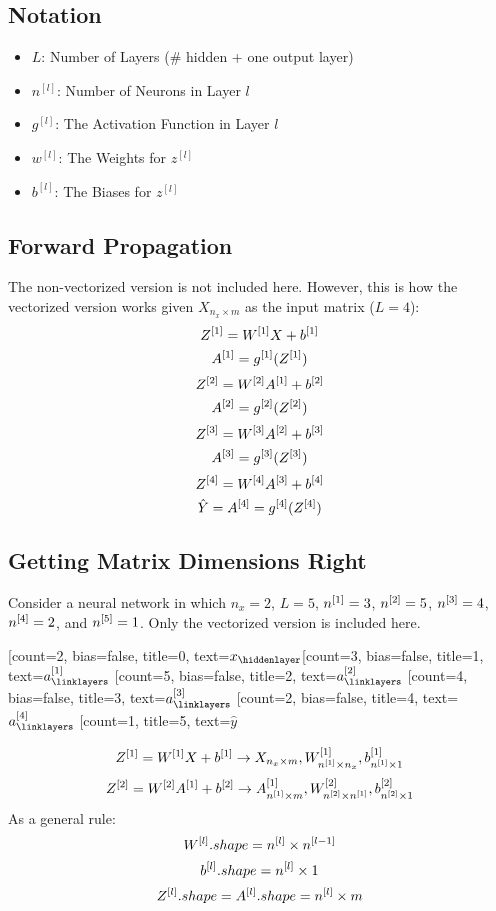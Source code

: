 \subsection{Notation}
\begin{itemize}
	\item $L$: Number of Layers (\# hidden + one output layer)
	\item $n^{[l]}$: Number of Neurons in Layer $l$
	\item $g^{[l]}$: The Activation Function in Layer $l$
	\item $w^{[l]}$: The Weights for $z^{[l]}$
	\item $b^{[l]}$: The Biases for $z^{[l]}$
\end{itemize}
\subsection{Forward Propagation}
The non-vectorized version is not included here. However, this is how the vectorized version works given $X_{n_x\times m}$ as the input matrix ($L=4$):
$$
Z^{[1]} = W^{[1]} X+ b^{[1]}
$$
$$
A^{[1]} = g^{[1]}(Z^{[1]})
$$
$$
Z^{[2]} = W^{[2]}A^{[1]}+b^{[2]}
$$
$$
A^{[2]} = g^{[2]}(Z^{[2]})
$$
$$
Z^{[3]} = W^{[3]}A^{[2]}+b^{[3]}
$$
$$
A^{[3]} = g^{[3]}(Z^{[3]})
$$
$$
Z^{[4]} = W^{[4]}A^{[3]}+b^{[4]}
$$
$$
\hat{Y} = A^{[4]} = g^{[4]}(Z^{[4]})
$$
\subsection{Getting Matrix Dimensions Right}
Consider a neural network in which $n_x=2$, $L=5$, $n^{[1]}=3$, $n^{[2]}=5$, $n^{[3]}=4$, $n^{[4]}=2$, and $n^{[5]}=1$. Only the vectorized version is included here. 

\begin{neuralnetwork}[]
        \newcommand{\x}[2]{$x_#2$}
        \newcommand{\y}[2]{$\hat{y}$}
        \newcommand{\hfirst}[2]{\small $a^{[1]}_#2$}
        \newcommand{\hsecond}[2]{\small $a^{[2]}_#2$}
        \newcommand{\hthird}[2]{\small $a^{[3]}_#2$}
        \newcommand{\hfourth}[2]{\small $a^{[4]}_#2$}
        [count=2, bias=false, title=0, text=\x]
        \hiddenlayer[count=3, bias=false, title=1, text=\hfirst] \linklayers
        \hiddenlayer[count=5, bias=false, title=2, text=\hsecond] \linklayers
        \hiddenlayer[count=4, bias=false, title=3, text=\hthird] \linklayers
        \hiddenlayer[count=2, bias=false, title=4, text=\hfourth] \linklayers
        \outputlayer[count=1, title=5, text=\y] \linklayers
\end{neuralnetwork}
$$
Z^{[1]} = W^{[1]}X + b^{[1]} \rightarrow X_{n_x\times m}, W^{[1]}_{n^{[1]}\times n_x}, b^{[1]}_{n^{[1]}\times 1}
$$
$$
Z^{[2]} = W^{[2]}A^{[1]} + b^{[2]} \rightarrow A^{[1]}_{n^{[1]}\times m}, W^{[2]}_{n^{[2]}\times n^{[1]}}, b^{[2]}_{n^{[2]}\times 1}
$$
As a general rule: 
$$
W^{[l]}.shape = n^{[l]}\times n^{[l-1]}
$$
$$
b^{[l]}.shape = n^{[l]}\times 1
$$
$$
Z^{[l]}.shape = A^{[l]}.shape = n^{[l]}\times m
$$
